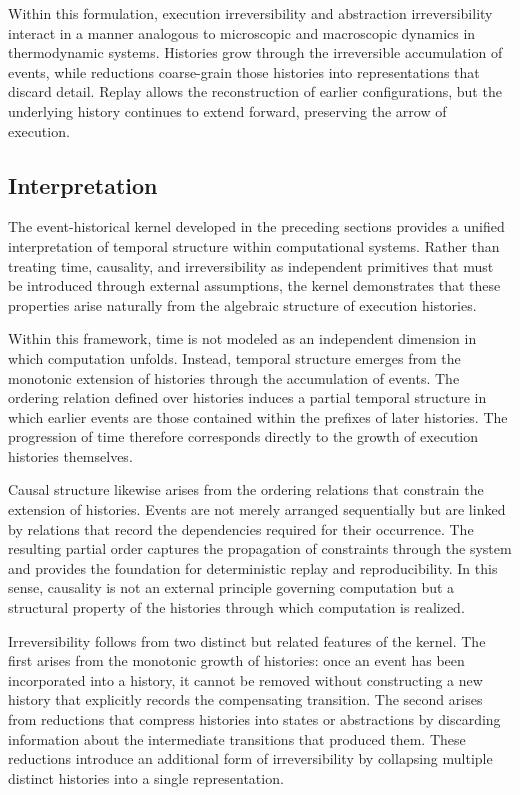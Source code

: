 \documentclass[12pt]{article}
\begin{document}
Within this formulation, execution irreversibility
and abstraction irreversibility interact in a manner
analogous to microscopic and macroscopic dynamics in
thermodynamic systems. Histories grow through the
irreversible accumulation of events, while reductions
coarse-grain those histories into representations that
discard detail. Replay allows the reconstruction of
earlier configurations, but the underlying history
continues to extend forward, preserving the arrow
of execution.

\subsection{Interpretation}

The event-historical kernel developed in the preceding
sections provides a unified interpretation of temporal
structure within computational systems. Rather than
treating time, causality, and irreversibility as
independent primitives that must be introduced through
external assumptions, the kernel demonstrates that
these properties arise naturally from the algebraic
structure of execution histories.

Within this framework, time is not modeled as an
independent dimension in which computation unfolds.
Instead, temporal structure emerges from the monotonic
extension of histories through the accumulation of
events. The ordering relation defined over histories
induces a partial temporal structure in which earlier
events are those contained within the prefixes of
later histories. The progression of time therefore
corresponds directly to the growth of execution
histories themselves.

Causal structure likewise arises from the ordering
relations that constrain the extension of histories.
Events are not merely arranged sequentially but are
linked by relations that record the dependencies
required for their occurrence. The resulting partial
order captures the propagation of constraints through
the system and provides the foundation for deterministic
replay and reproducibility. In this sense, causality is
not an external principle governing computation but a
structural property of the histories through which
computation is realized.

Irreversibility follows from two distinct but related
features of the kernel. The first arises from the
monotonic growth of histories: once an event has been
incorporated into a history, it cannot be removed
without constructing a new history that explicitly
records the compensating transition. The second arises
from reductions that compress histories into states or
abstractions by discarding information about the
intermediate transitions that produced them. These
reductions introduce an additional form of irreversibility
by collapsing multiple distinct histories into a single
representation.
\end{document}
